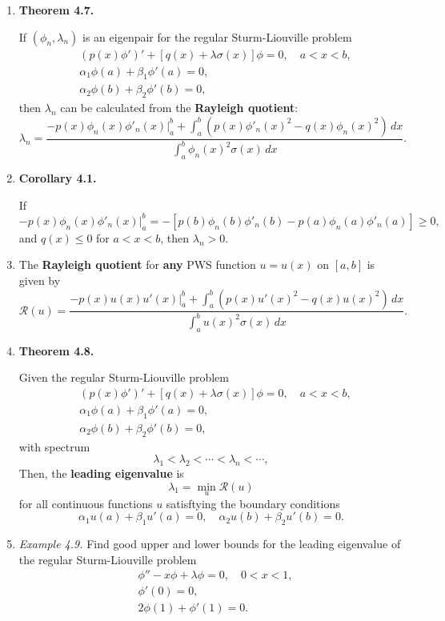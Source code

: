 \begin{enumerate}
\newpage

\item \textbf{Theorem 4.7.} 

If $(\phi _{n} , \lambda _{n})$ is an eigenpair for the regular Sturm-Liouville problem
\begin{align*}
& (p(x)\phi ' ) ' + [q(x) + \lambda \sigma(x)]\phi = 0, \quad a < x < b,\\
& \alpha _1 \phi(a) + \beta _1 \phi ' (a) = 0, \\
& \alpha _2 \phi(b) + \beta _2 \phi ' (b) = 0,
\end{align*}
then $\lambda _{n}$ can be calculated from the \textbf{Rayleigh quotient}:
\[
\lambda_{n} = \frac{ \displaystyle -p(x)\phi_{n}(x)\phi'_{n}(x)\Big|_{a}^{b} + \int_{a}^{b}(p(x)\phi'_{n}(x)^{2} - q(x)\phi_{n}(x)^{2}) \, dx }{ \displaystyle \int_{a}^{b}\phi_{n}(x)^{2}\sigma(x)\, dx}.
\]


\item \textbf{Corollary 4.1.} 

If 
\[-p(x)\phi_{n}(x)\phi'_{n}(x)\Big|_{a}^{b} = - [p(b)\phi_{n}(b)\phi'_{n}(b)-p(a)\phi_{n}(a)\phi'_{n}(a)]\geq 0,\]
and $q(x) \leq 0$ for $a < x < b$, then $\lambda _{n} > 0$.


\item The \textbf{Rayleigh quotient} for \textbf{any} PWS function $u=u(x)$ on $[a,b]$ is given by
\[
\mathcal{R}(u) = \frac{ \displaystyle -p(x)u(x)u'(x)\Big|_{a}^{b} + \int_{a}^{b}(p(x)u'(x)^{2} - q(x)u(x)^{2}) \, dx }{ \displaystyle \int_{a}^{b}u(x)^{2}\sigma(x)\, dx}.
\]

\item \textbf{Theorem 4.8.} 

Given the regular Sturm-Liouville problem
\begin{align*}
& (p(x)\phi ' ) ' + [q(x) + \lambda \sigma(x)]\phi = 0, \quad a < x < b,\\
& \alpha _1 \phi(a) + \beta _1 \phi ' (a) = 0, \\
& \alpha _2 \phi(b) + \beta _2 \phi ' (b) = 0,
\end{align*}
with spectrum
\[\lambda_{1}<\lambda_{2}<\cdots<\lambda_{n}<\cdots,\]
Then, the \textbf{leading eigenvalue} is
\[\lambda_{1}=\min_{u} \mathcal{R}(u)\]
for all continuous functions $u$ satisftying the boundary conditions
\[\alpha _1 u(a) + \beta _1 u' (a) = 0, \quad  \alpha _2 u(b) + \beta _2 u ' (b) = 0.\]


\newpage



\item \textit{Example 4.9.} Find good upper and lower bounds for the leading eigenvalue of the regular Sturm-Liouville problem
\begin{align*}
& \phi '' - x \phi + \lambda \phi = 0, \quad 0 < x < 1,\\
& \phi'(0) = 0, \\
& 2\phi(1) + \phi'(1) = 0.
\end{align*}






\end{enumerate}
